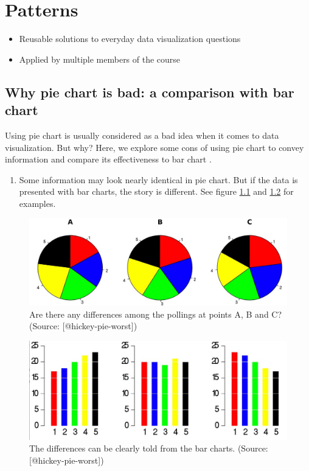 \documentclass[]{book}
\providecommand{\tightlist}{%
  \setlength{\itemsep}{0pt}\setlength{\parskip}{0pt}}
\theoremstyle{definition}
\theoremstyle{definition}
\theoremstyle{definition}
\theoremstyle{remark}
\begin{document}
\chapter{Patterns}\label{patterns}

\begin{itemize}
\tightlist
\item
  Reusable solutions to everyday data visualization questions
\item
  Applied by multiple members of the course
\end{itemize}

\section{Why pie chart is bad: a comparison with bar
chart}\label{why-pie-chart-is-bad-a-comparison-with-bar-chart}

Using pie chart is usually considered as a bad idea when it comes to
data visualization. But why? Here, we explore some cons of using pie
chart to convey information and compare its effectiveness to bar chart
\citep{hickey-pie-worst} \citep{henry-defense-pie} \citep{quach-penny}.

\begin{enumerate}
\def\labelenumi{\arabic{enumi}.}
\tightlist
\item
  Some information may look nearly identical in pie chart. But if the
  data is presented with bar charts, the story is different. See figure
  \ref{fig:hickey-before} and \ref{fig:hickey-after} for examples.
\end{enumerate}

\begin{figure}
\includegraphics[width=0.7\linewidth]{images/hickey-before} \caption{Are there any differences among the pollings at points A, B and C? (Source: [@hickey-pie-worst])}\label{fig:hickey-before}
\end{figure}

\begin{figure}
\includegraphics[width=0.7\linewidth]{images/hickey-after} \caption{The differences can be clearly told from the bar charts. (Source: [@hickey-pie-worst])}\label{fig:hickey-after}
\end{figure}
\end{document}
